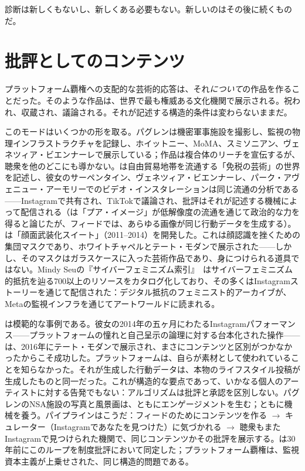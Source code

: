 \documentclass[10pt,letterpaper,twocolumn]{article}
\begin{document}
診断は新しくもないし、新しくある必要もない。新しいのはその後に続くものだ。

\section{批評としてのコンテンツ}

プラットフォーム覇権への支配的な芸術的応答は、それ\emph{について}の作品を作ることだった。そのような作品は、世界で最も権威ある文化機関で展示される。祝われ、収蔵され、議論される。それが記述する構造的条件は変わらないままだ。

このモードはいくつかの形を取る。パグレンは機密軍事施設を撮影し、監視の物理インフラストラクチャを記録し、ホイットニー、MoMA、スミソニアン、ヴェネツィア・ビエンナーレで展示している；作品は複合体のリーチを宣伝するが、聴衆を他のどこにも導かない。\citet{steyerl2017duty}は自由貿易地帯を流通する「免税の芸術」の世界を記述し、彼女のサーペンタイン、ヴェネツィア・ビエンナーレ、パーク・アヴェニュー・アーモリーでのビデオ・インスタレーションは同じ流通の分析である——Instagramで共有され、TikTokで議論され、批評はそれが記述する機械によって配信される（\citet{steyerl2009poor}は「プア・イメージ」が低解像度の流通を通じて政治的な力を得ると論じたが、フィードでは、あらゆる画像が同じ行動データを生成する）。\citet{blas2014informatic}は「顔面武装化スイート」（2011--2014）を開発した。これは顔認識を挫くための集団マスクであり、ホワイトチャペルとテート・モダンで展示された——しかし、そのマスクはガラスケースに入った芸術作品であり、身につけられる道具ではない。Mindy Seuの『サイバーフェミニズム索引』~\citep{seu2023cyberfeminism}はサイバーフェミニズム的抵抗を辿る700以上のリソースをカタログ化しており、その多くはInstagramストーリーを通じて配信された：デジタル抵抗のフェミニスト的アーカイブが、Metaの監視インフラを通じてアートワールドに読まれる。

\citet{ulman2014excellences}は模範的な事例である。彼女の2014年の五ヶ月にわたるInstagramパフォーマンス——プラットフォームの憧れと自己呈示の論理に対する台本化された操作——は、2016年にテート・モダンで展示され、まさにコンテンツと区別がつかなかったからこそ成功した。プラットフォームは、自らが素材として使われていることを知らなかった。それが生成した行動データは、本物のライフスタイル投稿が生成したものと同一だった。これが構造的な要点であって、いかなる個人のアーティストに対する告発でもない：アルゴリズムは批評と承認を区別しない。パグレンのNSA施設の写真と風景画は、ともにエンゲージメントを生む；ともに機械を養う。パイプラインはこうだ：フィードのためにコンテンツを作る $\rightarrow$ キュレーター（Instagramであなたを見つけた）に気づかれる $\rightarrow$ 聴衆もまたInstagramで見つけられた機関で、同じコンテンツかその批評を展示する。\citet{fraser2005critique}は30年前にこのループを制度批評において同定した；プラットフォーム覇権は、監視資本主義が上乗せされた、同じ構造的問題である。
\end{document}
